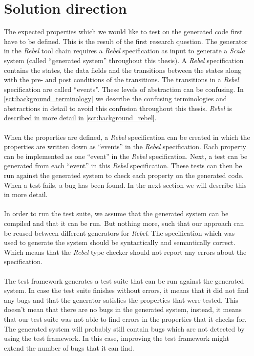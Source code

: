 \section{Solution direction}
The expected properties which we would like to test on the generated code
first have to be defined. This is the result of the first research question.
The generator in the \textit{Rebel} tool chain requires a \textit{Rebel}
specification as input to generate a \textit{Scala} system (called ``generated system'' throughout this thesis). A \textit{Rebel} specification contains the states, the data fields and the transitions between the states along with the pre- and post conditions of the transitions. The transitions in a \textit{Rebel} specification are called ``events''. These levels of abstraction can be confusing. In \autoref{sct:background_terminology} we describe the confusing terminologies and abstractions in detail to avoid this confusion throughout this thesis. \textit{Rebel} is described in more detail in \autoref{sct:background_rebel}.\\
\\
When the properties are defined, a \textit{Rebel} specification can be created in which the properties are written down as ``events'' in the \textit{Rebel} specification. Each property can be implemented as one ``event'' in the \textit{Rebel} specification. Next, a test can be generated from each ``event'' in this \textit{Rebel} specification. These tests can then be run against the generated system to check each property on the generated code. When a test fails, a bug has been found. In the next section we will describe this in more detail.\\
\\
In order to run the test suite, we assume that the generated system can be
compiled and that it can be run. But nothing more, such that our approach can be
reused between different generators for \textit{Rebel}. The specification which was used
to generate the system should be syntactically and semantically correct. Which
means that the \textit{Rebel} type checker should not report any errors about the
specification.\\
\\
The test framework generates a test suite that can be run against the generated
system. In case the test suite finishes without errors, it means that it did not
find any bugs and that the generator satisfies the properties that were tested.
This doesn't mean that there are no bugs in the generated system, instead, it
means that our test suite was not able to find errors in the properties that it
checks for. The generated system will probably still contain bugs which are not
detected by using the test framework. In this case, improving the test framework
might extend the number of bugs that it can find.

